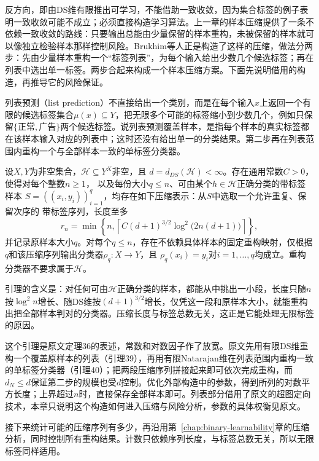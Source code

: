 反方向，即由DS维有限推出可学习，不能借助一致收敛，因为集合标签的例子表明一致收敛可能不成立；必须直接构造学习算法。上一章的样本压缩提供了一条不依赖一致收敛的路线：只要输出总能由少量保留的样本重构，未被保留的样本就可以像独立检验样本那样控制风险。Brukhim等人正是构造了这样的压缩，做法分两步：先由少量样本重构一个“标签列表”，为每个输入给出少数几个候选标签；再在列表中选出单一标签。两步合起来构成一个样本压缩方案。下面先说明借用的构造，再推导它的风险保证。

列表预测（list prediction）不直接给出一个类别，而是在每个输入$x$上返回一个有限的候选标签集合$\mu(x)\subseteq Y$，把无限多个可能的标签缩小到少数几个，例如只保留$\{\text{正常},\text{广告}\}$两个候选标签。说列表预测覆盖样本，是指每个样本的真实标签都在该样本输入对应的列表中；这时还没有给出单一的分类结果。第二步再在列表范围内重构一个与全部样本一致的单标签分类器。

\begin{lemma}[有限DS维的压缩构造]
\label{lem:finite-ds-compression}
设$X,Y$为非空集合，$\mathcal H\subseteq Y^X$非空，且
$d=d_{DS}(\mathcal H)<\infty$。存在通用常数$C>0$，使得对每个整数$n\geq1$，
以及每份大小$q\leq n$、可由某个$h\in\mathcal H$正确分类的带标签样本
$S=((x_i,y_i))_{i=1}^q$，均存在如下压缩表示：从$S$中选取一个允许重复、保留次序的
带标签序列，长度至多
\[
 r_n=\min\!\left\{n,\left\lceil
 C(d+1)^{3/2}\log^2\!\bigl(2n(d+1)\bigr)\right\rceil\right\},
\]
并记录原样本大小$q$。对每个$q\leq n$，存在不依赖具体样本的固定重构映射，仅根据
$q$和该压缩序列输出分类器$\rho_q:X\to Y$，且
$\rho_q(x_i)=y_i$对$i=1,\ldots,q$均成立。重构分类器不要求属于$\mathcal H$。
\end{lemma}

引理的含义是：对任何可由$\mathcal H$正确分类的样本，都能从中挑出一小段，长度只随$n$按$\log^2n$增长、随DS维按$(d+1)^{3/2}$增长，仅凭这一段和原样本大小，就能重构出把全部样本判对的分类器。压缩长度与标签总数无关，这正是它能处理无限标签的原因。

这个引理是原文定理36的表述，常数和对数因子作了放宽。原文先用有限DS维重构一个覆盖原样本的列表（引理39），再用有限Natarajan维在列表范围内重构一致的单标签分类器（引理40）；把两段压缩序列拼接起来即可依次完成重构，而$d_N\leq d$保证第二步的规模也受$d$控制。优化外部构造中的参数，得到所列的对数平方长度；上界超过$n$时，直接保存全部样本即可。列表部分借用了原文的超图定向技术，本章只说明这个构造如何进入压缩与风险分析，参数的具体权衡见原文。

接下来统计可能的压缩序列有多少，再沿用第~\ref{chap:binary-learnability}章的压缩分析，同时控制所有重构结果。计数只依赖序列长度，与标签总数无关，所以无限标签同样适用。

